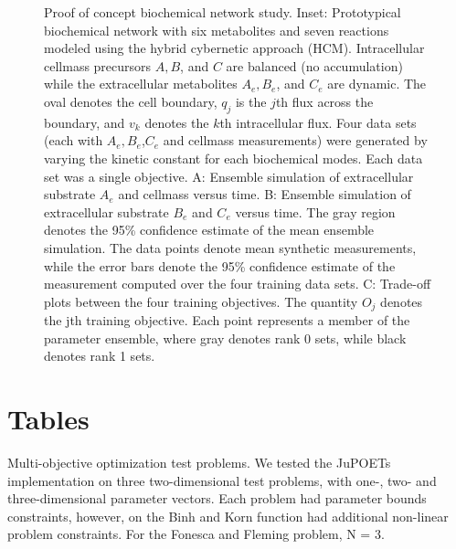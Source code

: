 \documentclass{bmcart}
\begin{document}
\begin{backmatter}
\begin{figure}[h]
  \caption{Proof of concept biochemical network study.
  Inset: Prototypical biochemical network with six metabolites and seven reactions modeled using the hybrid cybernetic approach (HCM).
  Intracellular cellmass precursors $A,B$, and $C$ are balanced (no accumulation) while the extracellular metabolites $A_{e},B_{e}$, and $C_{e}$ are dynamic.
  The oval denotes the cell boundary, $q_{j}$ is the $j$th flux across the boundary, and $v_{k}$ denotes the $k$th intracellular flux.
  Four data sets (each with $A_{e},B_{e}$,$C_{e}$ and cellmass measurements) were generated by varying the kinetic constant for each biochemical modes.
  Each data set was a single objective.
  A: Ensemble simulation of extracellular substrate $A_{e}$ and cellmass versus time.
  B: Ensemble simulation of extracellular substrate $B_{e}$ and $C_{e}$ versus time.
  The gray region denotes the 95\% confidence estimate of the mean ensemble simulation.
  The data points denote mean synthetic measurements, while the error bars denote the 95\% confidence estimate of the measurement computed over the four training data sets.
  C: Trade-off plots between the four training objectives. The quantity $O_{j}$ denotes the jth training objective.
  Each point represents a member of the parameter ensemble, where gray denotes rank 0 sets, while black denotes rank 1 sets.
   }\label{fig:fig-biochemical}
\end{figure}


\clearpage
\section*{Tables}

\begin{table}
  \caption{Multi-objective optimization test problems. We tested the JuPOETs implementation on three two-dimensional test problems, with one-, two- and three-dimensional parameter vectors.
  Each problem had parameter bounds constraints, however, on the Binh and Korn function had additional non-linear problem constraints. For the Fonesca and Fleming problem, N = 3.}
  \label{table:objective-table}
\end{table}



\end{backmatter}
\end{document}
